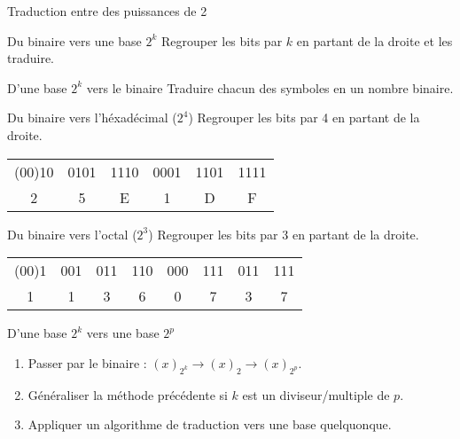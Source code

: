 \begin{frame}{Traduction entre des puissances de 2}
  \begin{block}{Du binaire vers une base $2^k$}
    Regrouper les bits par $k$ en partant de la droite et les traduire.
  \end{block}

   \begin{block}{D'une base $2^k$ vers le binaire}
     Traduire chacun des symboles en un nombre binaire.
   \end{block}

  \begin{exampleblock}{Du binaire vers l'héxadécimal ($2^4$)}
    Regrouper les bits par 4 en partant de la droite.
    \begin{tabular}{*{6}{c}}
      (00)10 & 0101 & 1110 & 0001 & 1101 & 1111 \\
      2      & 5    & E    & 1    & D    & F
    \end{tabular}
  \end{exampleblock}

  \begin{exampleblock}{Du binaire vers l'octal ($2^3$)}
    Regrouper les bits par 3 en partant de la droite.
    \begin{tabular}{*{8}{c}}
     (00)1 & 001 & 011 & 110 & 000 & 111 & 011 & 111 \\
      1    & 1   & 3   & 6   & 0   & 7   & 3   & 7
    \end{tabular}
  \end{exampleblock}


   \begin{block}{D'une base $2^k$ vers une base $2^p$}
     \begin{enumerate}
     \item<alert@1> Passer par le binaire : $(x)_{2^k} \rightarrow (x)_2 \rightarrow (x)_{2^p}$.
     \item Généraliser la méthode précédente si $k$ est un diviseur/multiple de $p$.
     \item Appliquer un algorithme de traduction vers une base quelquonque.
     \end{enumerate}
   \end{block}

 \end{frame}



